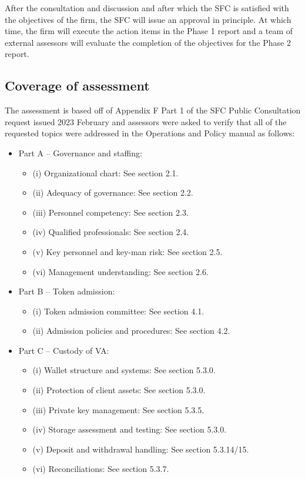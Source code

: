 \documentclass[]{report}
\begin{document}
After the consultation and discussion and after which the SFC is
satisfied with the objectives of the firm, the SFC will issue an
approval in principle.  At which time, the firm will execute the
action items in the Phase 1 report and a team of external assessors
will evaluate the completion of the objectives for the Phase 2 report.

\subsection{Coverage of assessment}
The assessment is based off of Appendix F Part 1 of the SFC Public
Consultation request issued 2023 February and assessors were asked to
verify that all of the requested topics were addressed in the
Operations and Policy manual as follows:
\begin{itemize}
\item Part A – Governance and staffing:
  \begin{itemize}
\item (i) Organizational chart: See section 2.1.
\item (ii) Adequacy of governance: See section 2.2.
\item (iii) Personnel competency: See section 2.3.
\item (iv) Qualified professionals: See section 2.4.
\item (v) Key personnel and key-man risk: See section 2.5.
\item (vi) Management understanding: See section 2.6.
\end{itemize}
\item Part B – Token admission:
\begin{itemize}
\item (i) Token admission committee: See section 4.1.
\item (ii) Admission policies and procedures: See section 4.2.
\end{itemize}

\item Part C – Custody of VA:
\begin{itemize}
\item (i) Wallet structure and systems: See section 5.3.0.
\item (ii) Protection of client assets: See section 5.3.0.
\item (iii) Private key management: See section 5.3.5.
\item (iv) Storage assessment and testing: See section 5.3.0.
\item (v) Deposit and withdrawal handling: See section 5.3.14/15.
\item (vi) Reconciliations: See section 5.3.7.
\end{itemize}


\end{itemize}
\end{document}
